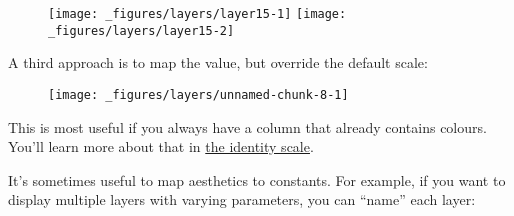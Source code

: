 \begin{figure}[H]
  \texttt{[image: \_figures/layers/layer15-1]}%
  \texttt{[image: \_figures/layers/layer15-2]}
\end{figure}

A third approach is to map the value, but override the default scale:

\begin{Shaded}
\begin{Highlighting}[]
\StringTok{ }
\StringTok{  }\NormalTok{(}\NormalTok{(} \NormalTok{)) +}\StringTok{ }
\StringTok{  }\NormalTok{()}
\end{Highlighting}
\end{Shaded}

\begin{figure}[H]
  \centering
  \texttt{[image: \_figures/layers/unnamed-chunk-8-1]}
\end{figure}

This is most useful if you always have a column that already contains
colours. You'll learn more about that in
\protect\hyperlink{sub:scale-identity}{the identity scale}.

It's sometimes useful to map aesthetics to constants. For example, if
you want to display multiple layers with varying parameters, you can
``name'' each layer:

\begin{Shaded}
\begin{Highlighting}[]
\StringTok{ }
\StringTok{  }\NormalTok{() +}
\StringTok{  }\NormalTok{(}\NormalTok{(} \NormalTok{), } \NormalTok{, } \NormalTok{) +}\StringTok{ }
\StringTok{  }\NormalTok{(}\NormalTok{(} \NormalTok{), } \NormalTok{, } \NormalTok{) +}
\StringTok{  }\NormalTok{(} \NormalTok{)}
\end{Highlighting}
\end{Shaded}

